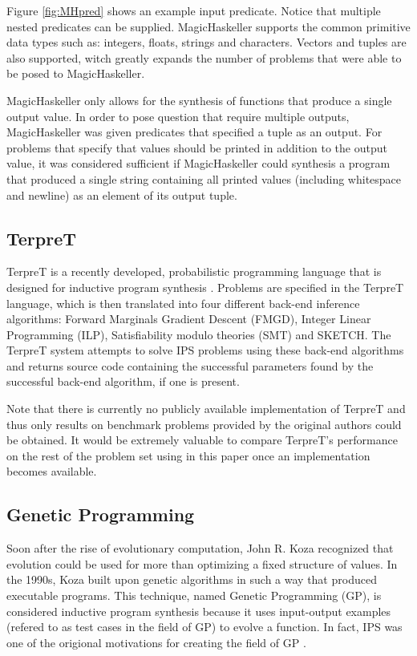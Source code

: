 Figure \ref{fig:MHpred} shows an example input predicate. Notice that multiple nested predicates can be supplied. MagicHaskeller supports the common primitive data types such as: integers, floats, strings and characters. Vectors and tuples are also supported, witch greatly expands the number of problems that were able to be posed to MagicHaskeller.

MagicHaskeller only allows for the synthesis of functions that produce a single output value. In order to pose question that require multiple outputs, MagicHaskeller was given predicates that specified a tuple as an output. For problems that specify that values should be printed in addition to the output value, it was considered sufficient if MagicHaskeller could synthesis a program that produced a single string containing all printed values (including whitespace and newline) as an element of its output tuple.

\subsection{TerpreT}

TerpreT is a recently developed, probabilistic programming language that is designed for inductive program synthesis \cite{Gaunt2016}. Problems are specified in the TerpreT language, which is then translated into four different back-end inference algorithms: Forward Marginals Gradient Descent (FMGD), Integer Linear Programming (ILP), Satisfiability modulo theories (SMT) and SKETCH.
The TerpreT system attempts to solve IPS problems using these back-end algorithms and returns source code containing the successful parameters found by the successful back-end algorithm, if one is present.

Note that there is currently no publicly available implementation of TerpreT and thus only results on benchmark problems provided by the original authors could be obtained. It would be extremely valuable to compare TerpreT's performance on the rest of the problem set using in this paper once an implementation becomes available.

\subsection{Genetic Programming}

Soon after the rise of evolutionary computation, John R. Koza recognized that evolution could be used for more than optimizing a fixed structure of values. In the 1990s, Koza built upon genetic algorithms in such a way that produced executable programs. This technique, named Genetic Programming (GP), is considered inductive program synthesis because it uses input-output examples (refered to as test cases in the field of GP) to evolve a function. In fact, IPS was one of the origional motivations for creating the field of GP \cite{Koza1992}. 


